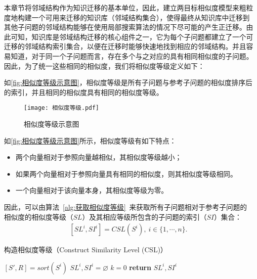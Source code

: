 本章节将邻域结构作为知识迁移的基本单位，因此，建立两目标相似度模型来粗粒度地构建一个可用来迁移的知识库（邻域结构集合），使得最终从知识库中迁移到其他子问题的邻域结构能够在使用局部搜索算法的情况下尽可能的产生正迁移。由此可知，知识库是邻域结构迁移的核心组件之一，它为每个子问题都建立了一个可迁移的邻域结构索引集合，以便在迁移时能够快速地找到相应的邻域结构。并且容易知道，对于同一个子问题而言，存在多个与之对应的具有相同相似度的子问题。因此，为了统一这些相同的相似度，我们将相似度等级定义如下：
\begin{definition}
    \label{def:Similarity Level}
    如\autoref{fig:相似度等级示意图}，相似度等级是所有子问题与参考子问题的相似度排序后的索引，并且相同的相似度具有相同的相似度等级。
\end{definition}
\begin{figure}[htb]
    \texttt{[image: 相似度等级.pdf]}
    \caption[相似度等级示意图]{相似度等级示意图}
    \label{fig:相似度等级示意图}
\end{figure}
如\autoref{fig:相似度等级示意图}所示，相似度等级有如下特点：
\begin{itemize}
    \item 两个向量相对于参照向量越相似，其相似度等级越小；
    \item 如果两个向量相对于参照向量具有相同的相似度，则其相似度等级相同。
    \item 一个向量相对于该向量本身，其相似度等级为零。
\end{itemize}
\par
因此，可以由算法~\ref{alg:获取相似度等级}~来获取所有子问题相对于参考子问题的相似度的相似度等级（$SL$）及其相应等级所包含的子问题的索引（$SI$）集合：
\begin{align}
    \label{eq:Similarity Level}
    [SL^i, SI^i] = CSL(S^i), \ i \in \{1,\cdots,n\}. 
\end{align}
\par
\begin{algorithm}
    \caption{构造相似度等级（Construct Similarity Level (CSL)）}
    \label{alg:获取相似度等级}
    \BlankLine
    $[S', R] = sort(S^i)$ \;
    $SL^i, SI^i = \varnothing$ \;
    $k = 0$ \;
    \textbf{return } $SL^i, SI^i $ \;
\end{algorithm}
